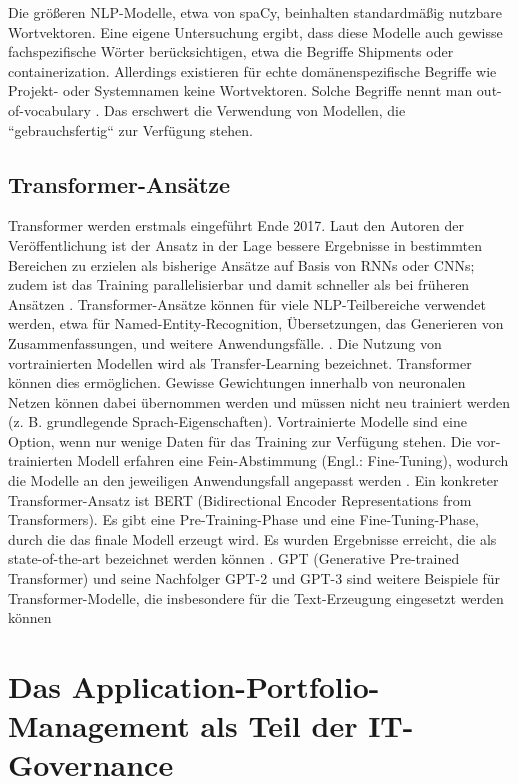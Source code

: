 Die größeren NLP-Modelle, etwa von spaCy, beinhalten standardmäßig nutzbare Wortvektoren. Eine eigene Untersuchung ergibt, dass diese Modelle auch gewisse fachspezifische Wörter berücksichtigen, etwa die Begriffe Shipments oder containerization. Allerdings existieren für echte domänenspezifische Begriffe wie Projekt- oder Systemnamen keine Wortvektoren. Solche Begriffe nennt man out-of-vocabulary \cite{spacy2}. Das erschwert die Verwendung von Modellen, die ``gebrauchsfertig`` zur Verfügung stehen. 

\subsection{Transformer-Ansätze}
Transformer werden erstmals eingeführt Ende 2017. Laut den Autoren der Veröffentlichung ist der Ansatz in der Lage bessere Ergebnisse in bestimmten Bereichen zu erzielen als bisherige Ansätze auf Basis von RNNs oder CNNs; zudem ist das Training parallelisierbar und damit schneller als bei früheren Ansätzen \cite{Vaswani}. Transformer-Ansätze können für viele NLP-Teilbereiche verwendet werden, etwa für Named-Entity-Recognition, Übersetzungen, das Generieren von Zusammenfassungen, und weitere Anwendungsfälle. \cite[S. 25-26]{Gupta}. Die Nutzung von vortrainierten Modellen wird als Transfer-Learning bezeichnet. Transformer können dies ermöglichen. Gewisse Gewichtungen innerhalb von neuronalen Netzen können dabei übernommen werden und müssen nicht neu trainiert werden (z. B. grundlegende Sprach-Eigenschaften). Vortrainierte Modelle sind eine Option, wenn nur wenige Daten für das Training zur Verfügung stehen. Die vor-trainierten Modell erfahren eine Fein-Abstimmung (Engl.: Fine-Tuning), wodurch die Modelle an den jeweiligen Anwendungsfall angepasst werden \cite[S. 45-56]{Alom}.
Ein konkreter Transformer-Ansatz ist BERT (Bidirectional Encoder Representations from Transformers). Es gibt eine Pre-Training-Phase und eine Fine-Tuning-Phase, durch die das finale Modell erzeugt wird. Es wurden Ergebnisse erreicht, die als state-of-the-art bezeichnet werden können \cite{devlin}. 
GPT (Generative Pre-trained Transformer) und seine Nachfolger GPT-2 und GPT-3 sind weitere Beispiele für Transformer-Modelle, die insbesondere für die Text-Erzeugung eingesetzt werden können \cite{Brown}

\section{Das Application-Portfolio-Management als Teil der IT-Governance}

